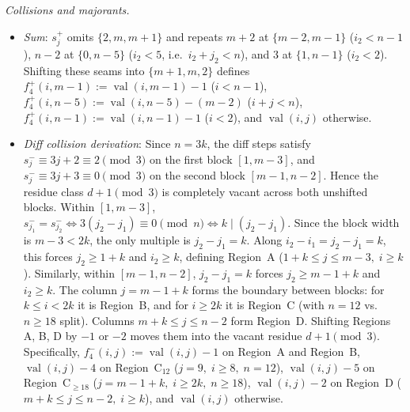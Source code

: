 \documentclass[10pt,a4paper]{article}
\theoremstyle{remark}
\newcommand{\val}{\operatorname{val}}
\begin{document}
\emph{Collisions and majorants.}
\begin{itemize}[nosep]
  \item \emph{Sum}: $s^+_j$ omits $\{2, m, m+1\}$ and repeats $m + 2$ at $\{m-2, m-1\}$ ($i_2 < n - 1$),
  $n - 2$ at $\{0, n-5\}$ ($i_2 < 5$, i.e.\ $i_2 + j_2 < n$), and $3$ at $\{1, n-1\}$ ($i_2 < 2$).
  Shifting these seams into $\{m+1, m, 2\}$ defines $f^+_4(i,m-1) := \val(i,m-1) - 1$ ($i < n-1$),
  $f^+_4(i,n-5) := \val(i,n-5) - (m-2)$ ($i + j < n$), $f^+_4(i,n-1) := \val(i,n-1) - 1$ ($i < 2$),
  and $\val(i,j)$ otherwise.
  \item \emph{Diff collision derivation}: Since $n = 3k$, the diff steps satisfy $s^-_j \equiv 3j + 2 \equiv 2 \pmod 3$
  on the first block $[1,m-3]$, and $s^-_j \equiv 3j + 3 \equiv 0 \pmod 3$ on the second block $[m-1,n-2]$.
  Hence the residue class $d + 1 \pmod 3$ is completely vacant across both unshifted blocks.
  Within $[1,m-3]$, $s^-_{j_1} = s^-_{j_2} \iff 3(j_2 - j_1) \equiv 0 \pmod n \iff k \mid (j_2 - j_1)$.
  Since the block width is $m - 3 < 2k$, the only multiple is $j_2 - j_1 = k$.
  Along $i_2 - i_1 = j_2 - j_1 = k$, this forces $j_2 \ge 1 + k$ and $i_2 \ge k$, defining
  Region~A ($1+k \le j \le m-3, \; i \ge k$).
  Similarly, within $[m-1,n-2]$, $j_2 - j_1 = k$ forces $j_2 \ge m - 1 + k$ and $i_2 \ge k$.
  The column $j = m - 1 + k$ forms the boundary between blocks: for $k \le i < 2k$ it is Region~B,
  and for $i \ge 2k$ it is Region~C (with $n = 12$ vs.\ $n \ge 18$ split). Columns $m + k \le j \le n - 2$
  form Region~D. Shifting Regions A, B, D by $-1$ or $-2$ moves them into the vacant residue $d + 1 \pmod 3$.
  Specifically, $f^-_4(i,j) := \val(i,j) - 1$ on Region~A and Region~B, $\val(i,j) - 4$ on Region~C$_{12}$
  ($j = 9, \; i \ge 8, \; n = 12$), $\val(i,j) - 5$ on Region~C$_{\ge 18}$ ($j = m-1+k, \; i \ge 2k, \; n \ge 18$),
  $\val(i,j) - 2$ on Region~D ($m+k \le j \le n-2, \; i \ge k$), and $\val(i,j)$ otherwise.
\end{itemize}
\end{document}
